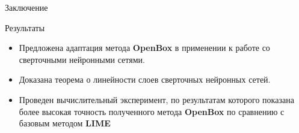\documentclass{beamer}
\begin{document}
\begin{frame}{Заключение}
    \begin{block}{Результаты}
    \begin{itemize}
        \item Предложена адаптация метода \textbf{OpenBox} в применении к работе со сверточными нейронными сетями.
        \item Доказана теорема о линейности слоев сверточных нейронных сетей.
        \item Проведен вычислительный эксперимент, по результатам которого показана более высокая точность полученного метода \textbf{OpenBox} по сравнению с базовым методом \textbf{LIME}
    \end{itemize}
    \end{block}
\end{frame}
\end{document}
